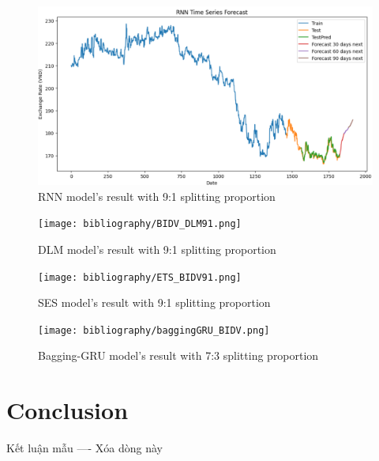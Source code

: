 \documentclass{ieeeojies}
\begin{document}
\begin{figure}[H]
  \centering
  \begin{minipage}{0.8\linewidth}
    \centering
    \includegraphics[width=\linewidth]{RNN_JPY.png}
    \caption{RNN model's result with 9:1 splitting proportion}
    \label{fig26}
  \end{minipage}
\end{figure}
\begin{figure}[H]
  \centering
  \begin{minipage}{0.8\linewidth}
    \centering
        \texttt{[image: bibliography/BIDV\_DLM91.png]}
    \caption{DLM model's result with 9:1 splitting proportion}
    \label{fig27}
  \end{minipage}
\end{figure}
\begin{figure}[H]
  \centering
  \begin{minipage}{0.8\linewidth}
    \centering
        \texttt{[image: bibliography/ETS\_BIDV91.png]}
    \caption{SES model's result with 9:1 splitting proportion}
    \label{fig28}
  \end{minipage}
\end{figure}
\begin{figure}[H]
  \centering
  \begin{minipage}{0.8\linewidth}
    \centering
        \texttt{[image: bibliography/baggingGRU\_BIDV.png]}
    \caption{Bagging-GRU model's result with 7:3 splitting proportion}
    \label{fig28}
  \end{minipage}
\end{figure}
\section{Conclusion}
Kết luận mẫu ---- Xóa dòng này
\end{document}
